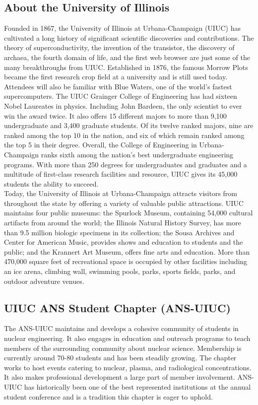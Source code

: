 \subsection{About the University of Illinois}
Founded in 1867, the University of Illinois at Urbana-Champaign (UIUC) has cultivated a long history of significant scientific discoveries and contributions. The theory of superconductivity, the invention of the transistor, the discovery of archaea, the fourth domain of life, and the first web browser are just some of the many breakthroughs from UIUC. Established in 1876, the famous Morrow Plots became the first research crop field at a university and is still used today. Attendees will also be familiar with Blue Waters, one of the world’s fastest supercomputers. 
The UIUC Grainger College of Engineering has had sixteen Nobel Laureates in physics. Including John Bardeen, the only scientist to ever win the award twice. It also offers 15 different majors to more than 9,100 undergraduate and 3,400 graduate students. Of its twelve ranked majors, nine are ranked among the top 10 in the nation, and six of which remain ranked among the top 5 in their degree. Overall, the College of Engineering in Urbana-Champaign ranks sixth among the nation’s best undergraduate engineering programs. With more than 250 degrees for undergraduates and graduates and a multitude of first-class research facilities and resource, UIUC gives its 45,000 students the ability to succeed.\\
Today, the University of Illinois at Urbana-Champaign attracts visitors from throughout the state by offering a variety of valuable public attractions. UIUC maintains four public museums: the Spurlock Museum, containing 54,000 cultural artifacts from around the world; the Illinois Natural History Survey, has more than 9.5 million biologic specimens in its collection; the Sousa Archives and Center for American Music, provides shows and education to students and the public; and the Krannert Art Museum, offers fine arts and education. More than 470,000 square feet of recreational space is occupied by other facilities including an ice arena, climbing wall, swimming pools, parks, sports fields, parks, and outdoor adventure venues. 

\subsection{UIUC ANS Student Chapter (ANS-UIUC)}
The ANS-UIUC maintains and develops a cohesive community of students in nuclear engineering. It also engages in education and outreach programs to teach members of the surrounding community about nuclear science. Membership is currently around 70-80 students and has been steadily growing. The chapter works to host events catering to nuclear, plasma, and radiological concentrations. It also makes professional development a large part of member involvement. ANS-UIUC has historically been one of the best represented institutions at the annual student conference and is a tradition this chapter is eager to uphold. 

